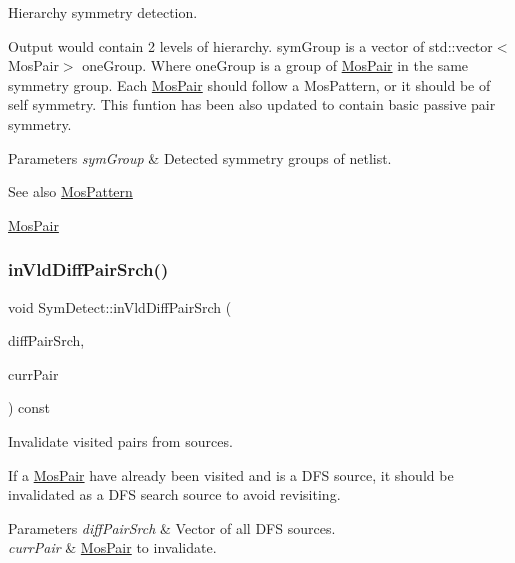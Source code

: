 Hierarchy symmetry detection. 

Output would contain 2 levels of hierarchy. sym\+Group is a vector of std\+::vector$<$\+Mos\+Pair$>$ one\+Group. Where one\+Group is a group of \hyperlink{classMosPair}{Mos\+Pair} in the same symmetry group. Each \hyperlink{classMosPair}{Mos\+Pair} should follow a Mos\+Pattern, or it should be of self symmetry. This funtion has been also updated to contain basic passive pair symmetry.


\begin{DoxyParams}{Parameters}
{\em sym\+Group} & Detected symmetry groups of netlist. \\
\hline
\end{DoxyParams}
\begin{DoxySeeAlso}{See also}
\hyperlink{type_8h_af19eddb079bfea723256710b029c38e8}{Mos\+Pattern} 

\hyperlink{classMosPair}{Mos\+Pair} 
\end{DoxySeeAlso}
\mbox{\label{classSymDetect_ae6a1ba27f6768f215cba0623b6e2ce08}} 
\subsubsection{\texorpdfstring{in\+Vld\+Diff\+Pair\+Srch()}{inVldDiffPairSrch()}}
{\footnotesize\ttfamily void Sym\+Detect\+::in\+Vld\+Diff\+Pair\+Srch (\begin{DoxyParamCaption}\item[{std\+::vector$<$ \hyperlink{classMosPair}{Mos\+Pair} $>$ \&}]{diff\+Pair\+Srch,  }\item[{\hyperlink{classMosPair}{Mos\+Pair} \&}]{curr\+Pair }\end{DoxyParamCaption}) const\hspace{0.3cm}{\ttfamily [private]}}



Invalidate visited pairs from sources. 

If a \hyperlink{classMosPair}{Mos\+Pair} have already been visited and is a D\+FS source, it should be invalidated as a D\+FS search source to avoid revisiting.


\begin{DoxyParams}{Parameters}
{\em diff\+Pair\+Srch} & Vector of all D\+FS sources. \\
\hline
{\em curr\+Pair} & \hyperlink{classMosPair}{Mos\+Pair} to invalidate. \\
\hline
\end{DoxyParams}
\mbox{\label{classSymDetect_aa832e51051f0ed9d3643c72b1d738684}} 
